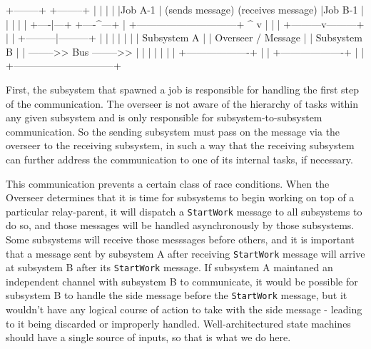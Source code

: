 \begin{verbnobox}
     +--------+                                                           +--------+
     |        |                                                           |        |
     |Job A-1 | (sends message)                       (receives message)  |Job B-1 |
     |        |                                                           |        |
     +----|---+                                                           +----^---+
          |                  +------------------------------+                  ^
          v                  |                              |                  |
+---------v---------+        |                              |        +---------|---------+
|                   |        |                              |        |                   |
| Subsystem A       |        |       Overseer / Message     |        | Subsystem B       |
|                   -------->>                  Bus         -------->>                   |
|                   |        |                              |        |                   |
+-------------------+        |                              |        +-------------------+
                             |                              |
                             +------------------------------+
\end{verbnobox}

First, the subsystem that spawned a job is responsible for handling the first
step of the communication. The overseer is not aware of the hierarchy of tasks
within any given subsystem and is only responsible for subsystem-to-subsystem
communication. So the sending subsystem must pass on the message via the
overseer to the receiving subsystem, in such a way that the receiving subsystem
can further address the communication to one of its internal tasks, if
necessary.
\newline

This communication prevents a certain class of race conditions. When the
Overseer determines that it is time for subsystems to begin working on top of a
particular relay-parent, it will dispatch a \verb|StartWork| message to all
subsystems to do so, and those messages will be handled asynchronously by those
subsystems. Some subsystems will receive those messsages before others, and it
is important that a message sent by subsystem A after receiving \verb|StartWork|
message will arrive at subsystem B after its \verb|StartWork| message. If
subsystem A maintaned an independent channel with subsystem B to communicate, it
would be possible for subsystem B to handle the side message before the
\verb|StartWork| message, but it wouldn't have any logical course of action to
take with the side message - leading to it being discarded or improperly
handled. Well-architectured state machines should have a single source of
inputs, so that is what we do here.
\newline

